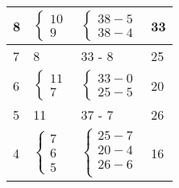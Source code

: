 \documentclass{report}
\begin{document}
\begin{multicols*}{2}
\begin{table}[H]
\begin{center}
\begin{tabular}{|l|l|l|l|}
            8 & \hspace{-1.1em}  
            $\begin{cases}
                10 \\
                9
            \end{cases}$ 
              & 
              \hspace{-1.1em}
              $\begin{cases}
                  38 - 5 \\ 
                  38 - 4 
              \end{cases}$ 
              & 33 

              \\ 
              \hline

            7 & 8 & 33 - 8 & 25 
            \\
            \hline

            6 & \hspace{-1.1em}  
            $\begin{cases}
                11 \\
                7
            \end{cases}$ 
              & 
              \hspace{-1.1em}
              $\begin{cases}
                  33 - 0 \\ 
                  25 - 5 
              \end{cases}$ 
              & 20 
              \\
              \hline            

            5 & 11 & 37 - 7 & 26 
            \\ 
            \hline           
            4 & \hspace{-1.1em}  
            $\begin{cases}
                7 \\
                6 \\  
                5
            \end{cases}$ 
              & \hspace{-.2em} 
              \hspace{-1.1em}
              $\begin{cases}
                  25 - 7 \\ 
                  20 - 4 \\ 
                  26 - 6 \\
              \end{cases}$ 
              & 16
              \\
              \hline            


\end{tabular}
\end{center}
\end{table}
\end{multicols*}
\end{document}
